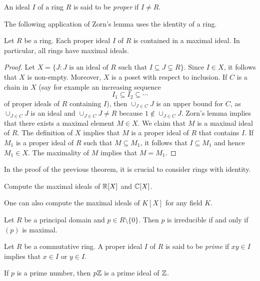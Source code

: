 An ideal $I$ of a ring $R$ is said to be \emph{proper}
if $I\ne R$. 

The following application of Zorn's lemma uses 
the identity of a ring.

\begin{theorem}[Krull]
	Let $R$ be a ring. Each proper ideal $I$ of $R$ 
	is contained in a maximal ideal. 
	In particular, all rings have maximal ideals. 	
\end{theorem}

\begin{proof}
	Let $X=\{J:J\text{ is an ideal of $R$ such that }I\subseteq J\subsetneq R\}$.
	Since $I\in X$, it follows that $X$ is non-empty. Moreover, $X$ is a poset
	with respect to inclusion. If $C$ is a chain in $X$ (say for example
	an increasing sequence
	\[
	I_1\subseteq I_2\subseteq\cdots
	\]
	of proper ideals of $R$ containing $I$), then 
	$\cup_{J\in C}J$ is an upper bound for $C$, as $\cup_{J\in C}J$ is an ideal and
	$\cup_{J\in C}J\ne R$ because $1\not\in\cup_{J\in C}J$. 	Zorn's lemma implies that
	there exists a maximal element $M\in X$. We claim that $M$ is a maximal ideal of $R$. The definition
	of $X$ implies that $M$ is a proper ideal of $R$ that contains $I$. If $M_1$ is a proper ideal of $R$
	such that $M\subseteq M_1$, it follows that $I\subseteq M_1$ and hence $M_1\in X$. The maximality
	of $M$ implies that $M=M_1$.  
\end{proof}

In the proof of the previous theorem, it is crucial to consider rings with 
identity. 

\begin{exercise}
	Compute the maximal ideals of $\mathbb{R}[X]$ and $\mathbb{C}[X]$. 	
\end{exercise}

One can also compute the maximal ideals of $K[X]$ for any field $K$. 

\begin{exercise}
	Let $R$ be a principal domain and $p\in R\setminus\{0\}$. 
	Then $p$ is irreducible 
	if and only if $(p)$ is maximal.	
\end{exercise}

\begin{definition}
Let $R$ be a commutative ring. A proper ideal $I$ of $R$ is said to be
\emph{prime} if $xy\in I$ implies that $x\in I$ or $y\in I$. 
\end{definition}

If $p$ is a prime number, then $p\mathbb{Z}$ is a prime ideal of $\mathbb{Z}$.

